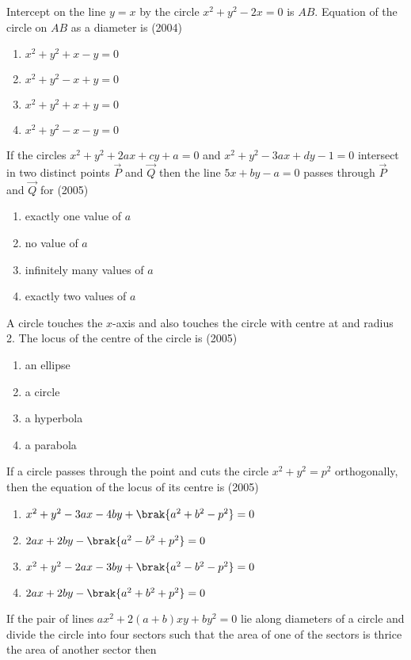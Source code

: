 \item Intercept on the line $y=x$ by the circle $x^2+y^2-2x=0$ is $AB$. Equation of the circle on $AB$ as a diameter is 
\hfill{(2004)}
\begin{enumerate}
\item $x^2+y^2+x-y=0$
\item $x^2+y^2-x+y=0$
\item $x^2+y^2+x+y=0$
\item $x^2+y^2-x-y=0$
\end{enumerate}
\item If the circles $x^2+y^2+2ax+cy+a=0$ and $x^2+y^2-3ax+dy-1=0$ intersect in two distinct points $\vec{P}$ and $\vec{Q}$ then the line $5x+by-a=0$ passes through $\vec{P}$ and $\vec{Q}$ for
\hfill{(2005)}
\begin{enumerate}
\item exactly one value of $a$
\item no value of $a$
\item infinitely many values of $a$
\item exactly two values of $a$
\end{enumerate}
\item A circle touches the $x$-axis and also touches the circle with centre at  and radius 2. The locus of the centre of the circle is
\hfill{(2005)}
\begin{multicols}{2}
\begin{enumerate}
\item an ellipse
\item a circle 
\item a hyperbola
\item a parabola
\end{enumerate}
\end{multicols}
\item If a circle passes through the point  and cuts the circle $x^2+y^2=p^2$ orthogonally, then the equation of the locus of its centre is 
\hfill{(2005)}
\begin{enumerate}
\item $x^2+y^2-3ax-4by+\brak{a^2+b^2-p^2}=0$
\item $2ax+2by-\brak{a^2-b^2+p^2}=0$
\item $x^2+y^2-2ax-3by+\brak{a^2-b^2-p^2}=0$
\item $2ax+2by-\brak{a^2+b^2+p^2}=0$
\end{enumerate}
\item If the pair of lines $ax^2+2(a+b)xy+by^2=0$ lie along diameters of a circle and divide the circle into four sectors such that the area of one of the sectors is thrice the area of another sector then
